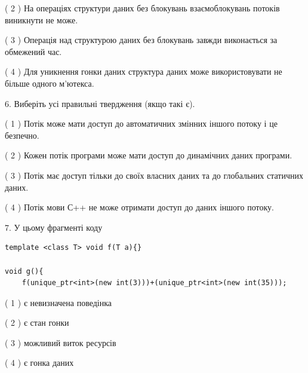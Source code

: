 \documentclass[12pt, ukrainian]{article}
\begin{document}
\begin {large}
{( 2 ) На операціях структури даних без блокувань взаємоблокувань потоків виникнути не може.%

( 3 ) Операція над структурою даних без блокувань завжди виконається за обмежений час.%

( 4 ) Для уникнення гонки даних структура даних може використовувати не більше одного м’ютекса.%
\newpage



\vspace{5mm}
6. Виберіть усі правильні твердження (якщо такі є).\par
\vspace{2mm}

( 1 ) Потік може мати доступ до автоматичних змінних іншого потоку і це безпечно.%

( 2 ) Кожен потік програми може мати доступ до динамічних даних програми.%

( 3 ) Потік має доступ тільки до своїх власних даних та до глобальних статичних даних.%

( 4 ) Потік мови С++ не може отримати доступ до даних іншого потоку.%


\vspace{5mm}
7. У цьому фрагменті коду
\begin{verbatim}
template <class T> void f(T a){}

void g(){
    f(unique_ptr<int>(new int(3)))+(unique_ptr<int>(new int(35)));
\end{verbatim}

( 1 ) є невизначена поведінка%

( 2 ) є стан гонки%

( 3 ) можливий виток ресурсів%

( 4 ) є гонка даних%
}
\end {large}
\end{document}
